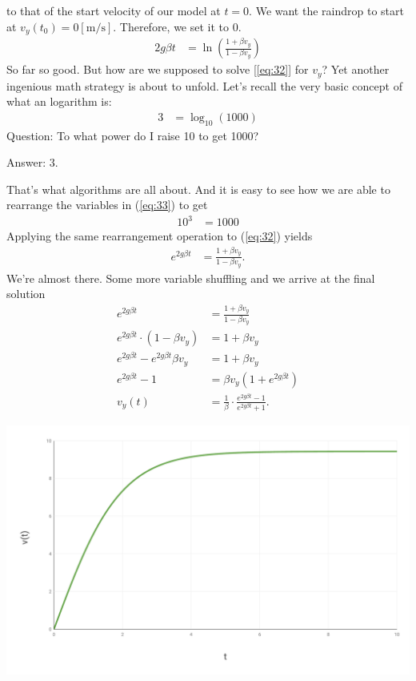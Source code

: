\documentclass[paper=a4, fontsize=11pt]{scrartcl} %
\numberwithin{equation}{section} %
\numberwithin{figure}{section} %
\numberwithin{table}{section} %
\begin{document}
to that of the start velocity of our model at $t = 0$. We want the raindrop to start at $v_y(t_0) = 0 [\si{\meter\per\second}]$.
Therefore, we set it to 0.
\begin{align} 
2 g \beta t &=  \ln{\left(\frac{1 + \beta v_y}{1 - \beta v_y} \right)} \label{eq:32}
\end{align}
So far so good. But how are we supposed to solve [\ref{eq:32}] for $v_y$? Yet another ingenious math strategy is about to unfold.
Let's recall the very basic concept of what an logarithm is:
\begin{align} 
3 &=  \log_{10}{(1000)} \label{eq:33}
\end{align}
Question: To what power do I raise 10 to get 1000?

Answer: 3.
\vspace{\baselineskip}

That's what algorithms are all about. And it is easy to see how we are able to rearrange the variables in (\ref{eq:33})
to get
\begin{align} 
10^3 &=  1000 \label{eq:34}
\end{align}
Applying the same rearrangement operation to (\ref{eq:32}) yields
\begin{align} 
e^{2 g \beta t} &=  \frac{1 + \beta v_y}{1 - \beta v_y}. \label{eq:33}
\end{align}
We're almost there. Some more variable shuffling and we arrive at the final solution
\begin{align} 
e^{2 g \beta t} &=  \frac{1 + \beta v_y}{1 - \beta v_y} \\
e^{2 g \beta t} \cdot \left(1 - \beta v_y \right) &= 1 + \beta v_y  \\
e^{2 g \beta t} - e^{2 g \beta t}\beta v_y &= 1 + \beta v_y  \\
e^{2 g \beta t} - 1 &= \beta v_y (1 + e^{2 g \beta t}) \\
v_y(t) &= \frac{1}{\beta} \cdot \frac{e^{2 g \beta t} - 1}{e^{2 g \beta t} + 1}.
\end{align}

\includegraphics[width=.95\linewidth]{graph}
\end{document}

